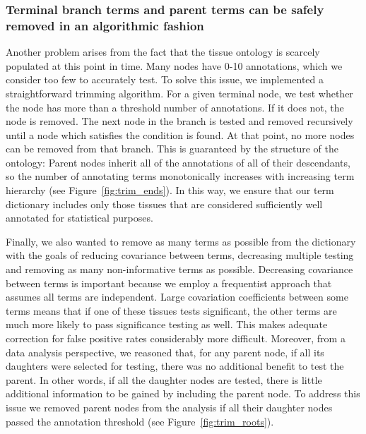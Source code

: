 \documentclass[linenumbers, doublespacing]{bmcart}
\begin{document}
\subsubsection*{Terminal branch terms and parent terms can be safely removed in an algorithmic fashion }
Another problem arises from the fact that the tissue ontology is scarcely populated at this point in time. Many nodes have 0-10 annotations, which we consider too few to accurately test. To solve this issue, we implemented a straightforward trimming algorithm. For a given terminal node, we test whether the node has more than a threshold number of annotations. If it does not, the node is removed. The next node in the branch is tested and removed recursively until a node which satisfies the condition is found. At that point, no more nodes can be removed from that branch. This is guaranteed by the structure of the ontology: Parent nodes inherit all of the annotations of all of their descendants, so the number of annotating terms monotonically increases with increasing term hierarchy (see Figure~\ref{fig:trim_ends}). In this way, we ensure that our term dictionary includes only those tissues that are considered sufficiently well annotated for statistical purposes.

	Finally, we also wanted to remove as many terms as possible from the dictionary with the goals of reducing covariance between terms, decreasing multiple testing and removing as many non-informative terms as possible. Decreasing covariance between terms is important because we employ a frequentist approach that assumes all terms are independent. Large covariation coefficients between some terms means that if one of these tissues tests significant, the other terms are much more likely to pass significance testing as well. This makes adequate correction for false positive rates considerably more difficult. Moreover, from a data analysis perspective, we reasoned that, for any parent node, if all its daughters were selected for testing, there was no additional benefit to test the parent. In other words, if all the daughter nodes are tested, there is little additional information to be gained by including the parent node.  To address this issue we removed parent nodes from the analysis if all their daughter nodes passed the annotation threshold (see Figure~\ref{fig:trim_roots}).
\end{document}
